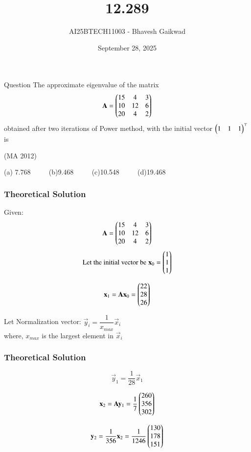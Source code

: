 \documentclass{beamer}
\title
{12.289}
\date{September 28, 2025}
\author 
{AI25BTECH11003 - Bhavesh Gaikwad}
\begin{document}
\frame{\titlepage}
\begin{frame}{Question}
The approximate eigenvalue of the matrix 
$$\mathbf{A} = \begin{pmatrix}15 & 4 & 3 \\ 10 & 12 & 6 \\ 20 & 4 & 2\end{pmatrix}$$
obtained after two iterations of Power method, with the initial vector $\begin{pmatrix}1 & 1 & 1\end{pmatrix}^\top$ is 

\hfill{(MA 2012)}

(a) 7.768 $\qquad$ (b)9.468 $\qquad$ (c)10.548 $\qquad$ (d)19.468
\end{frame}


\begin{frame}[fragile]
    \frametitle{Theoretical Solution}
Given: 
$$\mathbf{A} = \begin{pmatrix}15 & 4 & 3 \\ 10 & 12 & 6 \\ 20 & 4 & 2\end{pmatrix}$$
$$\text{Let the initial vector be} \; \mathbf{x}_0 = \begin{pmatrix}1 \\ 1 \\ 1\end{pmatrix}$$

\begin{equation}
\mathbf{x}_{1} = \mathbf{A}\mathbf{x}_0 = \begin{pmatrix}22 \\ 28 \\ 26\end{pmatrix}    
\end{equation}


Let Normalization vector: $\vec{y}_i = \dfrac{1}{x_{max}}\vec{x}_i$\\
where, $x_{max}$ is the largest element in $\vec{x}_i$
\end{frame}



\begin{frame}[fragile]
    \frametitle{Theoretical Solution}
\begin{equation}
\vec{y}_1 = \frac{1}{28}\vec{x}_1   
\end{equation}

\begin{equation}
\mathbf{x}_2 = \mathbf{A}\mathbf{y}_1 = \frac{1}{7}\begin{pmatrix}260 \\ 356 \\ 302\end{pmatrix} 
\end{equation}

\begin{equation}
    \mathbf{y}_2 = \frac{1}{356} \mathbf{x}_2 = \frac{1}{1246}\begin{pmatrix}130 \\ 178 \\ 151\end{pmatrix}
\end{equation}
\end{frame}
\end{document}
